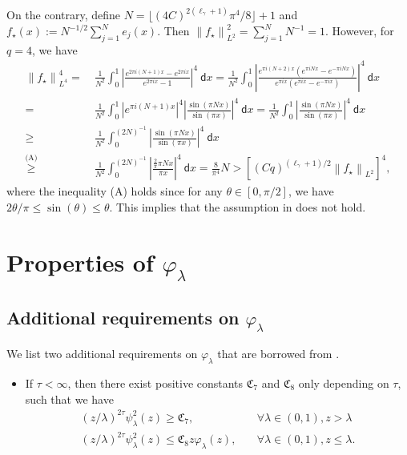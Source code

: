 \documentclass{article}
\theoremstyle{plain}
\theoremstyle{definition}
\theoremstyle{remark}
\newcommand{\reg}{\varphi_\lambda}
\newcommand{\rem}{\psi_\lambda}
\begin{document}
\begin{appendix}
On the contrary, define $N=\lfloor (4C)^{2(\ell_{\gamma}+1)} \pi^4 / 8 \rfloor +1$ and $f_{\star}(x):= N^{-1/2} \sum_{j=1}^{N} e_j(x)$. Then $\left\|f_{\star}\right\|_{L^2}^2 ={\sum_{j=1}^{N} N^{-1}} = 1$. However, for $q=4$, we have
\begin{align*}
    \left\|f_{\star}\right\|_{L^4}^4 
    = &~
    \frac{1}{N^2} \int_0^{1} \left|\frac{e^{2\pi i (N+1)x} - e^{2\pi i x}}{e^{2\pi i x} - 1}\right|^4 ~ \mathsf{d} x = 
    \frac{1}{N^2} \int_0^{1} \left|
    \frac{e^{\pi i (N+2)x}(e^{\pi i Nx} - e^{-\pi i Nx})}{e^{\pi i x}(e^{\pi i x} - e^{-\pi i x})}
    \right|^4 ~ \mathsf{d} x\\
    = &~
    \frac{1}{N^2} \int_0^{1} \left|
    e^{\pi i (N+1)x}
    \right|^4\left|
    \frac{\sin(\pi N x)}{\sin(\pi x)}
    \right|^4 ~ \mathsf{d} x = \frac{1}{N^2} \int_0^{1} \left|
    \frac{\sin(\pi N x)}{\sin(\pi x)}
    \right|^4 ~ \mathsf{d} x\\
    \geq &~
    \frac{1}{N^2} \int_0^{(2N)^{-1}} \left|
    \frac{\sin(\pi N x)}{\sin(\pi x)}
    \right|^4 ~ \mathsf{d} x\\
    \overset{\text{(A)}}{\geq} &~ 
    \frac{1}{N^2} \int_0^{(2N)^{-1}} \left|
    \frac{\frac{2}{\pi}\pi N x}{\pi x}
    \right|^4 ~ \mathsf{d} x = \frac{8}{\pi^4} N > \left[(C q)^{(\ell_{\gamma}+1) / 2}\left\|f_{\star}\right\|_{L^2}\right]^4,
\end{align*}
 where the inequality (A) holds since for any $\theta \in [0, \pi /2]$, we have $2\theta / \pi \leq \sin(\theta) \leq \theta$.
 This implies that the assumption in \cite{misiakiewicz2024non} does not hold. 



\section{Properties of $\reg$}\label{appendix_filter_property}

\subsection{Additional requirements on $\reg$}\label{appendix_addtion_require_of_reg}

We list two additional requirements on $\reg$ that are borrowed from \cite{lu2024saturation}.

\begin{itemize}
    \item If $\tau<\infty$, then there exist positive constants $\mathfrak{C}_{7}$ and $\mathfrak{C}_{8}$ only depending on $\tau$, such that we have
    \begin{align*}
    \label{eq:Filter_Rem_finite_case2}
        (z/\lambda)^{2\tau} \rem^2(z)  \geq \mathfrak{C}_{7},
        \quad 
        &\forall \lambda \in (0,1), z > \lambda\\
        (z/\lambda)^{2\tau} \rem^2(z)  \leq \mathfrak{C}_{8} z  \reg(z),
        \quad 
        &\forall \lambda \in (0,1), z \leq \lambda.
    \end{align*}


\end{itemize}
\end{appendix}
\end{document}
